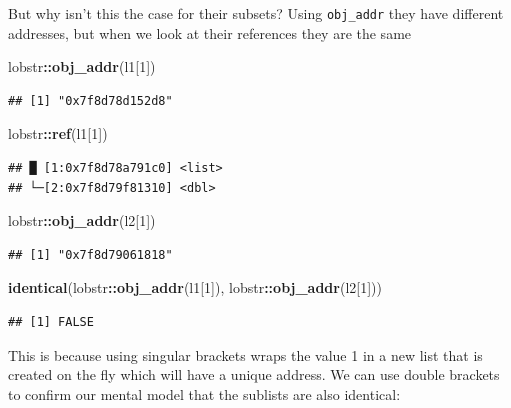 \documentclass[]{book}
\newenvironment{Shaded}{\begin{snugshade}}{\end{snugshade}}
\newcommand{\DecValTok}[1]{\textcolor[rgb]{0.00,0.00,0.81}{#1}}
\newcommand{\KeywordTok}[1]{\textcolor[rgb]{0.13,0.29,0.53}{\textbf{#1}}}
\newcommand{\NormalTok}[1]{#1}
\newcommand{\OperatorTok}[1]{\textcolor[rgb]{0.81,0.36,0.00}{\textbf{#1}}}
\begin{document}
But why isn't this the case for their subsets? Using \texttt{obj\_addr} they have different addresses, but when we look at their references they are the same

\begin{Shaded}
\begin{Highlighting}[]
\NormalTok{lobstr}\OperatorTok{::}\KeywordTok{obj_addr}\NormalTok{(l1[}\DecValTok{1}\NormalTok{])}
\end{Highlighting}
\end{Shaded}

\begin{verbatim}
## [1] "0x7f8d78d152d8"
\end{verbatim}

\begin{Shaded}
\begin{Highlighting}[]
\NormalTok{lobstr}\OperatorTok{::}\KeywordTok{ref}\NormalTok{(l1[}\DecValTok{1}\NormalTok{])}
\end{Highlighting}
\end{Shaded}

\begin{verbatim}
## █ [1:0x7f8d78a791c0] <list> 
## └─[2:0x7f8d79f81310] <dbl>
\end{verbatim}

\begin{Shaded}
\begin{Highlighting}[]
\NormalTok{lobstr}\OperatorTok{::}\KeywordTok{obj_addr}\NormalTok{(l2[}\DecValTok{1}\NormalTok{])}
\end{Highlighting}
\end{Shaded}

\begin{verbatim}
## [1] "0x7f8d79061818"
\end{verbatim}

\begin{Shaded}
\begin{Highlighting}[]
\KeywordTok{identical}\NormalTok{(lobstr}\OperatorTok{::}\KeywordTok{obj_addr}\NormalTok{(l1[}\DecValTok{1}\NormalTok{]), lobstr}\OperatorTok{::}\KeywordTok{obj_addr}\NormalTok{(l2[}\DecValTok{1}\NormalTok{]))}
\end{Highlighting}
\end{Shaded}

\begin{verbatim}
## [1] FALSE
\end{verbatim}

This is because using singular brackets wraps the value 1 in a new list that is created on the fly which will have a unique address. We can use double brackets to confirm our mental model that the sublists are also identical:
\end{document}

